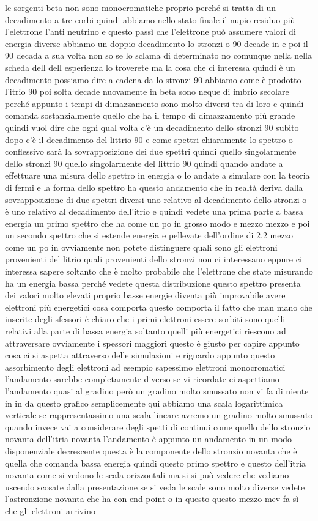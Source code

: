 le sorgenti beta non sono monocromatiche proprio perché si tratta di un decadimento a tre corbi quindi abbiamo nello stato finale il nupio residuo più l'elettrone l'anti neutrino e questo passì che l'elettrone può assumere valori di energia diverse abbiamo un doppio decadimento lo stronzi o 90 decade in e poi il 90 decada a sua volta non so se lo sclama di determinato no comunque nella nella scheda dell dell esperienza lo troverete ma la cosa che ci interessa quindi è un decadimento possiamo dire a cadena da lo stronzi 90 abbiamo come è prodotto l'itrio 90 poi solta decade nuovamente in beta sono neque di imbrio secolare perché appunto i tempi di dimazzamento sono molto diversi tra di loro e quindi comanda sostanzialmente quello che ha il tempo di dimazzamento più grande quindi vuol dire che ogni qual volta c'è un decadimento dello stronzi 90 subito dopo c'è il decadimento del littrio 90 e come spettri chiaramente lo spettro o conflessivo sarà la sovrapposizione dei due spettri quindi quello singolarmente dello stronzi 90 quello singolarmente del littrio 90 quindi quando andate a effettuare una misura dello spettro in energia o lo andate a simulare con la teoria di fermi e la forma dello spettro ha questo andamento che in realtà deriva dalla sovrapposizione di due spettri diversi uno relativo al decadimento dello stronzi o è uno relativo al decadimento dell'itrio e quindi vedete una prima parte a bassa energia un primo spettro che ha come un po in grosso modo e mezzo mezzo e poi un secondo spettro che si estende energia e pellevate dell'ordine di 2.2 mezzo come un po in ovviamente non potete distinguere quali sono gli elettroni provenienti del litrio quali provenienti dello stronzi non ci interessano eppure ci interessa sapere soltanto che è molto probabile che l'elettrone che state misurando ha un energia bassa perché vedete questa distribuzione questo spettro presenta dei valori molto elevati proprio basse energie diventa più improvabile avere elettroni più energetici cosa comporta questo comporta il fatto che man mano che inserite degli sfessori è chiaro che i primi elettroni essere sorbiti sono quelli relativi alla parte di bassa energia soltanto quelli più energetici riescono ad attraversare ovviamente i spessori maggiori questo è giusto per capire appunto cosa ci si aspetta attraverso delle simulazioni e riguardo appunto questo assorbimento degli elettroni ad esempio sapessimo elettroni monocromatici l'andamento sarebbe completamente diverso se vi ricordate ci aspettiamo l'andamento quasi al gradino però un gradino molto smussato non vi fa di niente in in da questo grafico semplicemente qui abbiamo una scala logarittimica verticale se rappresentassimo una scala lineare avremo un gradino molto smussato quando invece vai a considerare degli spetti di continui come quello dello stronzio novanta dell'itria novanta l'andamento è appunto un andamento in un modo disponenziale decrescente questa è la componente dello stronzio novanta che è quella che comanda bassa energia quindi questo primo spettro e questo dell'itria novanta come si vedono le scala orizzontali ma si si può vedere che vediamo uscendo scosate dalla presentazione se si veda le scale sono molto diverse vedete l'astronzione novanta che ha con end point o in questo questo mezzo mev fa sì che gli elettroni arrivino 